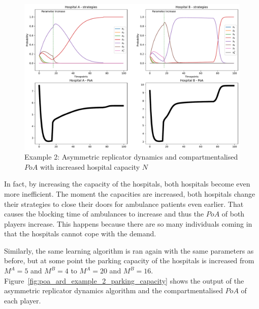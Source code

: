 \begin{figure}[H]
    \centering
    \includegraphics[width=\linewidth]{chapters/05_numerical_results/Bin/example_2/poa_ard_example_2_hospital_space.pdf}
    \caption{Example 2: Asymmetric replicator dynamics and compartmentalised
    \(PoA\) with increased hospital capacity \(N\)}
    \label{fig:poa_ard_example_2_system_capacity}
\end{figure}

In fact, by increasing the capacity of the hospitals, both hospitals become
even more inefficient.
The moment the capacities are increased, both hospitals change their strategies
to close their doors for ambulance patients even earlier.
That causes the blocking time of ambulances to increase and thus the \(PoA\) of
both players increase.
This happens because there are so many individuals coming in that the hospitals
cannot cope with the demand.

Similarly, the same learning algorithm is ran again with the same parameters as
before, but at some point the parking capacity of the hospitals is increased
from \(M^A = 5\) and \(M^B = 4\) to \(M^A = 20\) and \(M^B = 16\).
Figure~\ref{fig:poa_ard_example_2_parking_capacity} shows the output of the
asymmetric replicator dynamics algorithm and the compartmentalised \(PoA\) of
each player.

